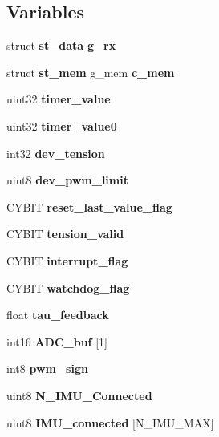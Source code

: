 \subsection*{Variables}
\begin{DoxyCompactItemize}
\item 
\mbox{\label{globals_8h_aa963ce8fafc11e104eb7ee22982d0345}} 
struct \textbf{ st\+\_\+data} {\bfseries g\+\_\+rx}
\item 
\mbox{\label{globals_8h_a44c3cbd8e234e0816f0334e29646a800}} 
struct \textbf{ st\+\_\+mem} g\+\_\+mem {\bfseries c\+\_\+mem}
\item 
\mbox{\label{globals_8h_ad47cd0e4d0fcf5739a88e52e949a8084}} 
uint32 {\bfseries timer\+\_\+value}
\item 
\mbox{\label{globals_8h_a9bab7f1b1cf2ba38d5968eee42644c32}} 
uint32 {\bfseries timer\+\_\+value0}
\item 
\mbox{\label{globals_8h_a53a494e9edc739a4f7c884778d1a93b1}} 
int32 {\bfseries dev\+\_\+tension}
\item 
\mbox{\label{globals_8h_a21f4f67e4203dea0b9956589eaa6cef3}} 
uint8 {\bfseries dev\+\_\+pwm\+\_\+limit}
\item 
\mbox{\label{globals_8h_aa89a782cfe75ce7970236babd308fe69}} 
C\+Y\+B\+IT {\bfseries reset\+\_\+last\+\_\+value\+\_\+flag}
\item 
\mbox{\label{globals_8h_ac42fa606610c2600210d9b7b2c1d0882}} 
C\+Y\+B\+IT {\bfseries tension\+\_\+valid}
\item 
\mbox{\label{globals_8h_a1e6fda88dfdabc63859f8907eb702920}} 
C\+Y\+B\+IT {\bfseries interrupt\+\_\+flag}
\item 
\mbox{\label{globals_8h_a156a860c465529ff2f515725ab816a58}} 
C\+Y\+B\+IT {\bfseries watchdog\+\_\+flag}
\item 
\mbox{\label{globals_8h_a894b799ffe45f442a6a897580ab7e98e}} 
float {\bfseries tau\+\_\+feedback}
\item 
\mbox{\label{globals_8h_a56c9d5eb4a24dbc15f90f8b7bad5f8df}} 
int16 {\bfseries A\+D\+C\+\_\+buf} [1]
\item 
\mbox{\label{globals_8h_a8ac7ad7c894db750e93bc745818e26ca}} 
int8 {\bfseries pwm\+\_\+sign}
\item 
\mbox{\label{globals_8h_a47118db87acd24ae6dac18b036f360ec}} 
uint8 {\bfseries N\+\_\+\+I\+M\+U\+\_\+\+Connected}
\item 
\mbox{\label{globals_8h_a99668f3210aba0be3baec19486621bce}} 
uint8 {\bfseries I\+M\+U\+\_\+connected} [N\+\_\+\+I\+M\+U\+\_\+\+M\+AX]
\item 

\end{DoxyCompactItemize}
